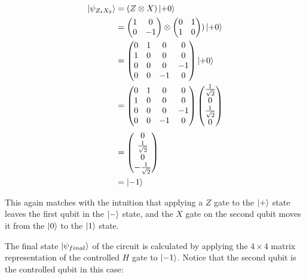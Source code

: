 \begin{align}
  \Ket{\psi_{Z_1X_2}}  &= (Z \otimes X) \Ket{+0} \\
                    &= \begin{pmatrix} 1 & 0 \\ 0 & -1 \end{pmatrix} \otimes \begin{pmatrix} 0 & 1 \\ 1 & 0 \end{pmatrix}) \Ket{+0} \\
                    &= \begin{pmatrix} 0 & 1 & 0 & 0 \\ 1 & 0 & 0 & 0 \\ 0 & 0 & 0 & -1 \\ 0 & 0 & -1 & 0 \end{pmatrix} \Ket{+0} \\
                    &= \begin{pmatrix} 0 & 1 & 0 & 0 \\ 1 & 0 & 0 & 0 \\ 0 & 0 & 0 & -1 \\ 0 & 0 & -1 & 0 \end{pmatrix} \begin{pmatrix} \frac{1}{\sqrt{2}} \\ 0 \\ \frac{1}{\sqrt{2}} \\ 0 \end{pmatrix} \\
                    &= \begin{pmatrix} 0 \\ \frac{1}{\sqrt{2}} \\ 0 \\ -\frac{1}{\sqrt{2}} \end{pmatrix} \\
                    &= \Ket{-1}
\end{align}

This again matches with the intuition that applying a $Z$ gate to the $\Ket{+}$
state leaves the first qubit in the $\Ket{-}$ state, and the $X$ gate on the second qubit moves it from the $\Ket{0}$ to the $\Ket{1}$ state.

The final state $\Ket{\psi_{final}}$ of the circuit is calculated by applying the $4 \times 4$ matrix
representation of the controlled $H$ gate to $\Ket{-1}$. Notice that the second
qubit is the controlled qubit in this case:

